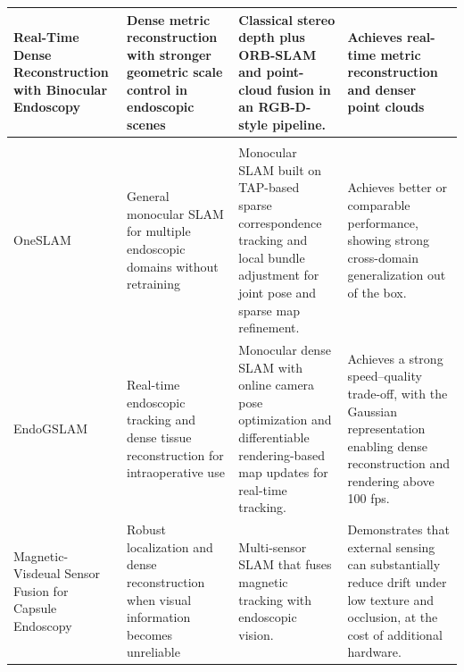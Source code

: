 \begin{footnotesize}
\begin{longtable}{>{\raggedright\arraybackslash}p{}>{\raggedright\arraybackslash}p{}>{\raggedright\arraybackslash}p{}>{\raggedright\arraybackslash}p{}}
    \addlinespace
    Real-Time Dense Reconstruction with Binocular Endoscopy~\cite{huo2023stereo} & Dense metric reconstruction with stronger geometric scale control in endoscopic scenes & Classical stereo depth plus ORB-SLAM and point-cloud fusion in an RGB-D-style pipeline. & Achieves real-time metric reconstruction and denser point clouds \\
    \midrule
    \multicolumn{4}{c}{\textbf{SLAM}} \\
    \midrule
    OneSLAM~\cite{oneslam2024} & General monocular SLAM for multiple endoscopic domains without retraining & Monocular SLAM built on TAP-based sparse correspondence tracking and local bundle adjustment for joint pose and sparse map refinement. & Achieves better or comparable performance, showing strong cross-domain generalization out of the box. \\
    \addlinespace
    EndoGSLAM~\cite{endogslam2024} & Real-time endoscopic tracking and dense tissue reconstruction for intraoperative use & Monocular dense SLAM with online camera pose optimization and differentiable rendering-based map updates for real-time tracking. & Achieves a strong speed--quality trade-off, with the Gaussian representation enabling dense reconstruction and rendering above 100 fps. \\
    \addlinespace
    Magnetic-Visdeual Sensor Fusion for Capsule Endoscopy~\cite{turan2017magnetic} & Robust localization and dense reconstruction when visual information becomes unreliable & Multi-sensor SLAM that fuses magnetic tracking with endoscopic vision. & Demonstrates that external sensing can substantially reduce drift under low texture and occlusion, at the cost of additional hardware. \\
    \end{longtable}
\end{footnotesize}

